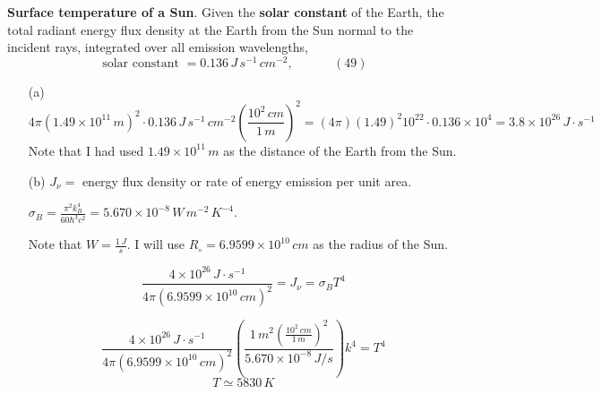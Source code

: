 \documentclass[twoside]{amsart}
\theoremstyle{plain}
\theoremstyle{definition}
\newcommand{\solutionhead}[1]
  {
   \noindent{\small\bf Solution #1.}
   }
\begin{document}
\solutionhead{2}  \textbf{ Surface temperature of a Sun}.  
Given the \textbf{solar constant} of the Earth, the total radiant energy flux density at the Earth from the Sun normal to the incident rays, integrated over all emission wavelengths, 
\[
\text{ solar constant } = 0.136 \, J \, s^{-1} \, cm^{-2}, \quad \quad \quad \, (49)
\]
\begin{itemize}
\item[(a)] \[
4 \pi (1.49 \times 10^{11} \, m )^2 \cdot 0.136 \, J \, s^{-1} \, cm^{-2} \left( \frac{ 10^2 \, cm}{ 1 \, m } \right)^2 = (4 \pi ) ( 1.49)^2 10^{22} \cdot 0.136 \times 10^4 = \boxed{ 3.8 \times 10^{26} \, J \cdot s^{-1} }
\]
Note that I had used $1.49 \times 10^{11} \, m$ as the distance of the Earth from the Sun.  
\item[(b)] $J_{\nu} = $ energy flux density or rate of energy emission per unit area.  

$\sigma_B = \frac{ \pi^2 k_B^4}{ 60 \hbar^3 c^2 } = 5.670 \times 10^{-8} \, W \, m^{-2} \, K^{-4}$.

Note that $W = \frac{1 \, J}{s}$.  I will use $R_{\circ} = 6.9599 \times 10^{10} \, cm$ as the radius of the Sun.  

\[
\frac{ 4 \times 10^{26} \, J \cdot s^{-1} }{ 4 \pi ( 6.9599 \times 10^{10} \, cm)^2 } = J_{\nu} = \sigma_B T^4
\]

\[
\frac{ 4 \times 10^{26} \, J \cdot s^{-1} }{ 4 \pi ( 6.9599 \times 10^{10} \, cm)^2 } \left( \frac{ 1 \, m^2 \left( \frac{ 10^2 \, cm }{ 1 \, m } \right)^2  }{ 5.670 \times 10^{-8} \, J/s } \right)k^4 = T^4
\]
\[
\boxed{ T \simeq 5830 \, K }
\]
\end{itemize} 
\end{document}
